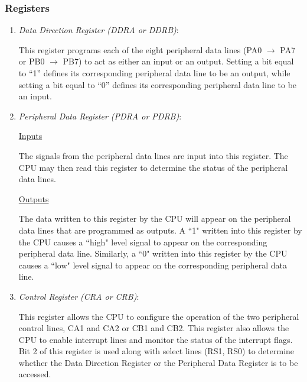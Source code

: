 \documentclass[12pt,Letter]{article}
\begin{document}
\subsubsection{Registers}
\begin{enumerate}
	\item \textit{Data Direction Register (DDRA or DDRB)}: 
	
	\vspace{.2cm}
	This register programs each of the eight peripheral data lines (PA0 $\to$ PA7 or PB0 $\to$ PB7) to act as either an input or an output. Setting a bit equal to “1” defines its corresponding peripheral data line to be an output, while setting a bit equal to “0” defines its corresponding peripheral data line to be an input\cite{expman}.
	
	\item \textit{Peripheral Data Register (PDRA or PDRB)}:
	
	\vspace{.2cm}
	\underline{Inputs}
	
	\vspace{.2cm}
	The signals from the peripheral data lines are input into this register. The CPU may then read this register to determine the status of the peripheral data lines\cite{expman}.
	
	\vspace{.2cm}
	\underline{Outputs}
	
	\vspace{.2cm}
	The data written to this register by the CPU will appear on the peripheral data lines that are programmed as outputs. A ``1" written into this register by the CPU causes a ``high" level signal to appear on the corresponding peripheral data line. Similarly, a ``0" written into this register by the CPU causes a ``low" level signal to appear on the corresponding peripheral data line\cite{expman}.
	
	\item \textit{Control Register (CRA or CRB)}:
	
	\vspace{.2cm}
	This register allows the CPU to configure the operation of the two peripheral control lines, CA1 and CA2 or CB1 and CB2. This register also allows the CPU to enable interrupt lines and monitor the status of the interrupt flags. Bit 2 of this register is used along with select lines (RS1, RS0) to determine whether the Data Direction Register or the Peripheral Data Register is to be accessed\cite{expman}.
\end{enumerate}
\end{document}

